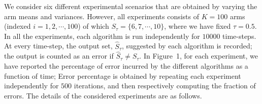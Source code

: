 
\noindent
We consider six different experimental scenarios that are obtained by varying the arm means and variances. 
However, all experiments consists of $K=100$  arms (indexed $i=1,2,\cdots,100$) of which ${S}_\tau=\{6,7,\cdots,10\}$, where we have fixed $\tau=0.5$.
In all the experiments, each algorithm is run independently for $10000$ time-steps. At every time-step, the output set,  $\hat{S}_\tau$, suggested by each algorithm is recorded; the output is counted as an error if $\hat{S}_\tau\ne S_\tau$. In Figure~1, for each experiment, we have reported the percentage of error incurred by the different algorithms as a function of time; Error percentage is obtained by repeating each experiment independently  for $500$ iterations, and then respectively computing the fraction of errors. The details of the considered experiments are as follows.


 
